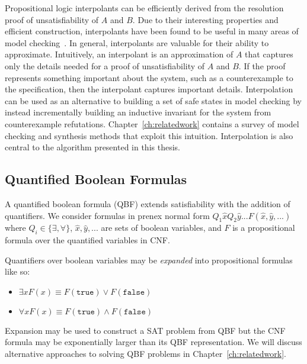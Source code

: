 Propositional logic interpolants can be efficiently derived from the resolution proof of unsatisfiability of $A$ and $B$. Due to their interesting properties and efficient construction, interpolants have been found to be useful in many areas of model checking~\cite{McMillan05}. In general, interpolants are valuable for their ability to approximate. Intuitively, an interpolant is an approximation of $A$ that captures only the details needed for a proof of unsatisfiability of $A$ and $B$. If the proof represents something important about the system, such as a counterexample to the specification, then the interpolant captures important details.  Interpolation can be used as an alternative to building a set of safe states in model checking by instead incrementally building an inductive invariant for the system from counterexample refutations. Chapter~\ref{ch:relatedwork} contains a survey of model checking and synthesis methods that exploit this intuition. Interpolation is also central to the algorithm presented in this thesis.

\subsection{Quantified Boolean Formulas}
\label{sec:backgroundQBF}

A quantified boolean formula (QBF) extends satisfiability with the addition of quantifiers. We consider formulas in prenex normal form $Q_1 \hat{x} Q_2 \hat{y} ... F(\hat{x}, \hat{y}, ...)$ where $Q_i \in \{ \exists, \forall \}$, $\hat{x}, \hat{y}, ...$ are sets of boolean variables, and $F$ is a propositional formula over the quantified variables in CNF.

Quantifiers over boolean variables may be \emph{expanded} into propositional formulas like so:

\begin{itemize}
    \item $\exists x F(x) \equiv F(\texttt{true}) \lor F(\texttt{false})$
    \item $\forall x F(x) \equiv F(\texttt{true}) \land F(\texttt{false})$
\end{itemize}

Expansion may be used to construct a SAT problem from QBF but the CNF formula may be exponentially larger than its QBF representation. We will discuss alternative approaches to solving QBF problems in Chapter~\ref{ch:relatedwork}.

